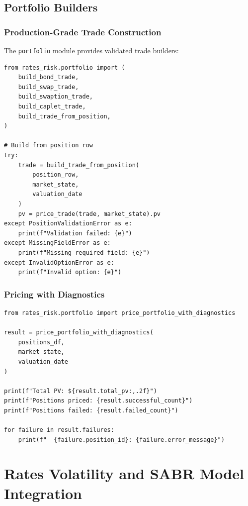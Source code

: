 \documentclass[12pt,a4paper]{report}
\newcommand{\code}[1]{\texttt{#1}}
\begin{document}
\section{Portfolio Builders}

\subsection{Production-Grade Trade Construction}

The \code{portfolio} module provides validated trade builders:

\begin{lstlisting}
from rates_risk.portfolio import (
    build_bond_trade,
    build_swap_trade,
    build_swaption_trade,
    build_caplet_trade,
    build_trade_from_position,
)

# Build from position row
try:
    trade = build_trade_from_position(
        position_row,
        market_state,
        valuation_date
    )
    pv = price_trade(trade, market_state).pv
except PositionValidationError as e:
    print(f"Validation failed: {e}")
except MissingFieldError as e:
    print(f"Missing required field: {e}")
except InvalidOptionError as e:
    print(f"Invalid option: {e}")
\end{lstlisting}

\subsection{Pricing with Diagnostics}

\begin{lstlisting}
from rates_risk.portfolio import price_portfolio_with_diagnostics

result = price_portfolio_with_diagnostics(
    positions_df,
    market_state,
    valuation_date
)

print(f"Total PV: ${result.total_pv:,.2f}")
print(f"Positions priced: {result.successful_count}")
print(f"Positions failed: {result.failed_count}")

for failure in result.failures:
    print(f"  {failure.position_id}: {failure.error_message}")
\end{lstlisting}

\chapter{Rates Volatility and SABR Model Integration}
\end{document}
